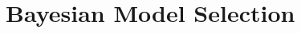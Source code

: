 \begin{comment}
\begin{verbatim}
             without mask
                              female?            male?
    model                   D    p0  sigma    D   p0   sigma
D(sex),g0(sex),\sigma      2.45 0.08 6435.51 3.16 0.04 6435.51
D,g0,\sigma                2.83 0.06 6298.66 2.83 0.06 6298.66
D(sex),g0,\sigma           2.69 0.06 6298.69 2.96 0.06 6298.69
D(sex),g0(sex),\sigma(sex) 2.59 0.08 6080.70 2.99 0.04 6833.16
D(sex),g0, \sigma(sex)     2.70 0.06 6280.49 2.95 0.06 6319.03


             with mask
                              female?            male?
    model                   D    p0  sigma    D   p0   sigma
D(sex),g0(sex),\sigma      3.64 0.07 6382.88 4.73 0.03 6382.88
D(sex),g0(sex)\sigma(sex)  3.87 0.07 5859.40 4.41 0.03 7039.09
D, g0, \sigma              4.18 0.05 6282.62 4.18 0.05 6282.62
D(sex),g0,\sigma           3.98 0.05 6282.65 4.38 0.05 6282.65
D(sex),g0,\sigma(sex)      3.93 0.05 6357.26 4.41 0.05 6220.22
\end{verbatim}
\end{comment}




\section{Bayesian Model Selection}

